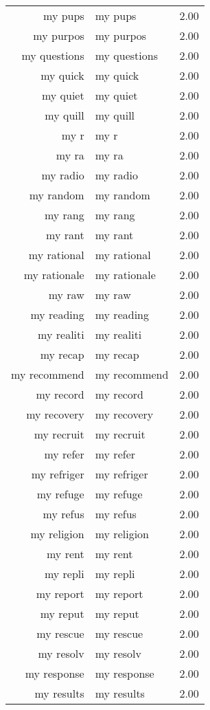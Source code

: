 \begin{table}[ht]
\begin{tabular}{rlr}
  my pups & my pups & 2.00 \\ 
  my purpos & my purpos & 2.00 \\ 
  my questions & my questions & 2.00 \\ 
  my quick & my quick & 2.00 \\ 
  my quiet & my quiet & 2.00 \\ 
  my quill & my quill & 2.00 \\ 
  my r & my r & 2.00 \\ 
  my ra & my ra & 2.00 \\ 
  my radio & my radio & 2.00 \\ 
  my random & my random & 2.00 \\ 
  my rang & my rang & 2.00 \\ 
  my rant & my rant & 2.00 \\ 
  my rational & my rational & 2.00 \\ 
  my rationale & my rationale & 2.00 \\ 
  my raw & my raw & 2.00 \\ 
  my reading & my reading & 2.00 \\ 
  my realiti & my realiti & 2.00 \\ 
  my recap & my recap & 2.00 \\ 
  my recommend & my recommend & 2.00 \\ 
  my record & my record & 2.00 \\ 
  my recovery & my recovery & 2.00 \\ 
  my recruit & my recruit & 2.00 \\ 
  my refer & my refer & 2.00 \\ 
  my refriger & my refriger & 2.00 \\ 
  my refuge & my refuge & 2.00 \\ 
  my refus & my refus & 2.00 \\ 
  my religion & my religion & 2.00 \\ 
  my rent & my rent & 2.00 \\ 
  my repli & my repli & 2.00 \\ 
  my report & my report & 2.00 \\ 
  my reput & my reput & 2.00 \\ 
  my rescue & my rescue & 2.00 \\ 
  my resolv & my resolv & 2.00 \\ 
  my response & my response & 2.00 \\ 
  my results & my results & 2.00 \\ 

\end{tabular}
\end{table}
